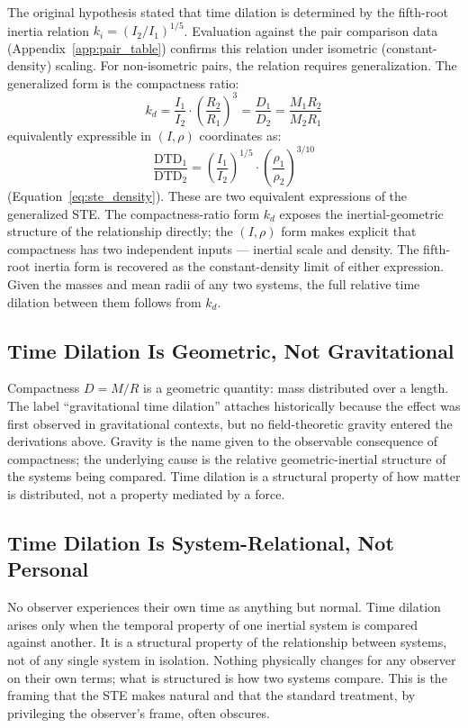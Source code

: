 \documentclass[twoside,twocolumn,9pt]{article}
\begin{document}
The original hypothesis stated that time dilation is determined by the fifth-root inertia relation $k_i = (I_2/I_1)^{1/5}$. Evaluation against the pair comparison data (Appendix~\ref{app:pair_table}) confirms this relation under isometric (constant-density) scaling. For non-isometric pairs, the relation requires generalization. The generalized form is the compactness ratio:
\[
k_d = \frac{I_1}{I_2} \cdot \left(\frac{R_2}{R_1}\right)^3 = \frac{D_1}{D_2} = \frac{M_1 R_2}{M_2 R_1}
\]
equivalently expressible in $(I, \rho)$ coordinates as:
\[
\frac{\text{DTD}_1}{\text{DTD}_2} = \left(\frac{I_1}{I_2}\right)^{1/5} \cdot \left(\frac{\rho_1}{\rho_2}\right)^{3/10}
\]
(Equation~\ref{eq:ste_density}). These are two equivalent expressions of the generalized STE. The compactness-ratio form $k_d$ exposes the inertial-geometric structure of the relationship directly; the $(I, \rho)$ form makes explicit that compactness has two independent inputs --- inertial scale and density. The fifth-root inertia form is recovered as the constant-density limit of either expression. Given the masses and mean radii of any two systems, the full relative time dilation between them follows from $k_d$.

\subsection{Time Dilation Is Geometric, Not Gravitational}

Compactness $D = M/R$ is a geometric quantity: mass distributed over a length. The label ``gravitational time dilation'' attaches historically because the effect was first observed in gravitational contexts, but no field-theoretic gravity entered the derivations above. Gravity is the name given to the observable consequence of compactness; the underlying cause is the relative geometric-inertial structure of the systems being compared. Time dilation is a structural property of how matter is distributed, not a property mediated by a force.

\subsection{Time Dilation Is System-Relational, Not Personal}

No observer experiences their own time as anything but normal. Time dilation arises only when the temporal property of one inertial system is compared against another. It is a structural property of the relationship between systems, not of any single system in isolation. Nothing physically changes for any observer on their own terms; what is structured is how two systems compare. This is the framing that the STE makes natural and that the standard treatment, by privileging the observer's frame, often obscures.
\end{document}
